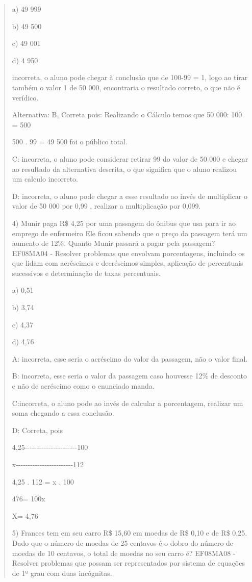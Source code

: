 \begin{quote}
\begin{escolha}
a) 49 999

b) 49 500

c) 49 001

d) 4 950

incorreta, o aluno pode chegar à conclusão que de 100-99 = 1, logo ao
tirar também o valor 1 de 50 000, encontraria o resultado correto, o que
não é verídico.

Alternativa: B, Correta pois: Realizando o Cálculo temos que 50 000: 100
= 500

500 . 99 = 49 500 foi o público total.

C: incorreta, o aluno pode considerar retirar 99 do valor de 50 000 e
chegar ao resultado da alternativa descrita, o que significa que o aluno
realizou um calculo incorreto.

D: incorreta, o aluno pode chegar a esse resultado ao invés de
multiplicar o valor de 50 000 por 0,99 , realizar a multiplicação por
0,099.

4) Munir paga R\$ 4,25 por uma passagem do ônibus que usa para ir ao
emprego de enfermeiro Ele ficou sabendo que o preço da passagem terá um
aumento de 12\%. Quanto Munir passará a pagar pela passagem? EF08MA04 -
Resolver problemas que envolvam porcentagens, incluindo os que lidam com
acréscimos e decréscimos simples, aplicação de percentuais sucessivos e
determinação de taxas percentuais.

a) 0,51

b) 3,74

c) 4,37

d) 4,76

A: incorreta, esse seria o acréscimo do valor da passagem, não o valor
final.

B: incorreta, esse seria o valor da passagem caso houvesse 12\% de
desconto e não de acréscimo como o enunciado manda.

C:incorreta, o aluno pode ao invés de calcular a porcentagem, realizar
um soma chegando a essa conclusão.

D: Correta, pois

4,25-\/-\/-\/-\/-\/-\/-\/-\/-\/-\/-\/-\/-\/-\/-\/-\/-\/-\/-\/-\/-\/-100

x-\/-\/-\/-\/-\/-\/-\/-\/-\/-\/-\/-\/-\/-\/-\/-\/-\/-\/-\/-\/-\/-\/-\/-112

4,25 . 112 = x . 100

476= 100x

X= 4,76

5) Frances tem em seu carro R\$ 15,60 em moedas de R\$ 0,10 e de R\$
0,25. Dado que o número de moedas de 25 centavos é o dobro do número de
moedas de 10 centavos, o total de moedas no seu carro é? EF08MA08 -
Resolver problemas que possam ser representados por sistema de equações
de 1º grau com duas incógnitas.


\end{escolha}
\end{quote}
